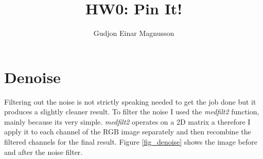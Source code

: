 \documentclass[12pt]{article}
\begin{document}
\title{HW0: Pin It!}
\author{Gudjon Einar Magnusson}

\maketitle


\section{Denoise}

Filtering out the noise is not strictly speaking needed to get the job done but it produces a slightly cleaner result. To filter the noise I used the \textit{medfilt2} function, mainly because its very simple. \textit{medfilt2} operates on a 2D matrix a therefore I apply it to each channel of the RGB image separately and then recombine the filtered channels for the final result. Figure \ref{fig_denoise} shows the image before and after the noise filter.
\end{document}
